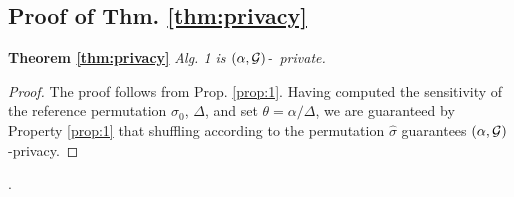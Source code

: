  \subsection{Proof of Thm. \ref{thm:privacy}}\label{app:thm:privacy}
 \textbf{Theorem \ref{thm:privacy}}
 \emph{Alg. 1 is $(\alpha,\mathcal{G})$-\name~private. }
 \begin{proof} The proof follows from Prop. \ref{prop:1}. Having computed the sensitivity of the reference permutation $\sigma_0$, $\Delta$, and set $\theta = \alpha / \Delta$, we are guaranteed by Property \ref{prop:1} that shuffling according to the permutation $\hat{\sigma}$ guarantees $(\alpha, \mathcal{G})$-\name privacy. 
 
 \end{proof}.

 
 
